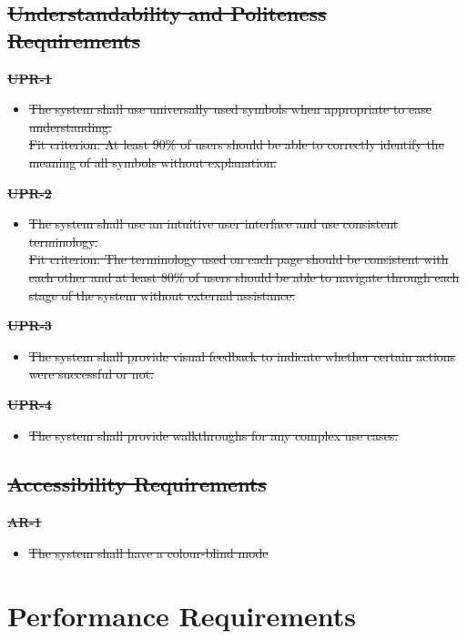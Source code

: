 \documentclass[12pt]{article}
\begin{document}
\subsection{\sout{Understandability and Politeness Requirements}}
\textbf{\sout{UPR-1}}
\begin{itemize}
    \item \sout{The system shall use universally used symbols when appropriate to ease understanding. \\
    Fit criterion: At least 90\% of users should be able to correctly identify the meaning of all symbols without explanation. }
\end{itemize}
\textbf{\sout{UPR-2}}
\begin{itemize}
    \item \sout{The system shall use an intuitive user interface and use consistent terminology. \\
    Fit criterion: The terminology used on each page should be consistent with each other and at least 80\% of users should be able to navigate through each stage of the system without external assistance. }
\end{itemize}
\textbf{\sout{UPR-3}}
\begin{itemize}
    \item \sout{The system shall provide visual feedback to indicate whether certain actions were successful or not.}
\end{itemize}
\textbf{\sout{UPR-4}}
\begin{itemize}
    \item \sout{The system shall provide walkthroughs for any complex use cases.}
\end{itemize}

\subsection{\sout{Accessibility Requirements}}
\textbf{\sout{AR-1}}
\begin{itemize}
    \item \sout{The system shall have a colour-blind mode}
\end{itemize}

\section{Performance Requirements}
\end{document}
